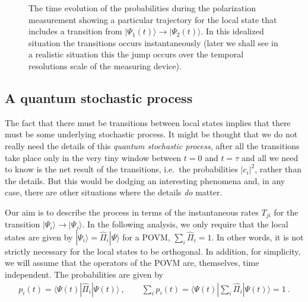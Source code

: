 \documentclass[12pt]{article}
\theoremstyle{plain}
\theoremstyle{definition}
\theoremstyle{remark}
\def\bra#1{\langle #1|}
\def\ket#1{| #1\rangle}
\newcommand{\EQ}[1]{\begin{equation}\begin{split} #1
\end{split}\end{equation}}
\begin{document}
\begin{figure}[ht]
\begin{center}
\begin{tikzpicture}[yscale=0.17,xscale=0.27]
\end{tikzpicture}
\end{center}
\caption{The time evolution of the probabilities during the polarization measurement showing a particular trajectory for the local state that includes a transition from $\ket{\Psi_1(t)}\to\ket{\Psi_2(t)}$. In this idealized situation the transitions occurs instantaneously (later we shall see in a realistic situation this the jump occurs over the temporal resolutions scale of the measuring device).}
\label{f6}
\end{figure}

\subsection{A quantum stochastic process}\label{s6.1}

The fact that there must be transitions between local states implies that there must be some underlying stochastic process. It might be thought that we do not really need the details of this {\it quantum stochastic process\/}, after all the transitions take place only in the very tiny window between $t=0$ and $t=\tau$ and all we need to know is the 
net result of the transitions, i.e.~the probabilities $|c_i|^2$, rather than the details. But this would be dodging an interesting phenomena and, in any case, there are other situations where the details {\it do\/} matter.

Our aim is to describe the process in terms of the instantaneous rates $T_{ji}$ for the transition $\ket{\Psi_i}\to\ket{\Psi_j}$.
In the following analysis, we only require that the local states are given by $\ket{\Psi_i}=\hat\Pi_i\ket{\Psi}$ for a POVM,
$\sum_i\hat\Pi_i=1$. In other words, it is not strictly necessary for the local states to be orthogonal. In addition, for simplicity, we will assume that the operators of the POVM are, themselves, time independent. The probabilities are given by
\EQ{
p_i(t)=\bra{\Psi(t)}\hat\Pi_i\ket{\Psi(t)}\ ,\qquad\sum_ip_i(t)=\bra{\Psi(t)}\sum_i\hat\Pi_i\ket{\Psi(t)}=1\ .
}
\end{document}
